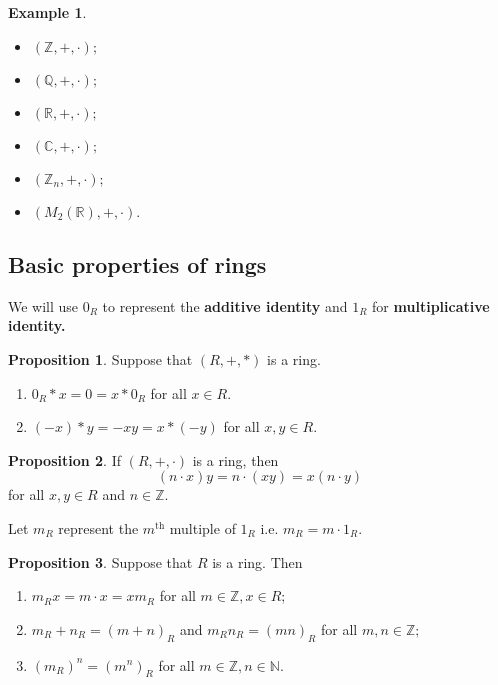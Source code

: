 \documentclass[12pt, a4paper]{article}
\newcommand{\bb}[1]{\mathbb{#1}}
\theoremstyle{definition}
\newtheorem*{example}{Example}
\newtheorem{proposition}{Proposition}
\theoremstyle{plain}
\begin{document}
\begin{example} \hphantom{This is to make it look nice.}
\begin{itemize}

	\item $(\bb{Z},+,\cdot);$

	\item $(\bb{Q},+,\cdot);$

	\item $(\bb{R},+,\cdot);$

	\item $(\bb{C},+,\cdot);$

	\item $(\bb{Z}_n,+,\cdot);$

	\item $(M_2(\bb{R}),+,\cdot).$

\end{itemize}
\end{example}

\subsection{Basic properties of rings}

We will use $0_R$ to represent the \textbf{additive identity} and $1_R$ for \textbf{multiplicative identity.}

\begin{proposition}
Suppose that $(R, +, *)$ is a ring.
\begin{enumerate}

	\item $0_R * x = 0 = x *0_R$ for all $x\in R.$

	\item $(-x) * y = -xy = x*(-y)$ for all $x,y \in R.$

\end{enumerate}
\end{proposition}

\begin{proposition}
If $(R,+,\cdot)$ is a ring, then 
$$(n\cdot x)y= n\cdot (xy) = x(n \cdot y)$$ for all $x,y \in R$ and $n\in \bb{Z}.$
\end{proposition}

Let $m_R$ represent the $m^{\text{th}}$ multiple of $1_R$ i.e. $m_R=m\cdot 1_R.$

\begin{proposition}
Suppose that $R$ is a ring. Then
\begin{enumerate}
	
	\item $m_Rx=m\cdot x=xm_R$ for all $m \in \bb{Z}, x
	\in R;$

	\item $m_R+n_R =(m+n)_R$ and $m_Rn_R=(mn)_R$ for all $m,n \in \bb{Z};$

	\item $(m_R)^n=(m^n)_R$ for all $m\in \bb{Z}, n\in \bb{N}.$
\end{enumerate}
\end{proposition}
\end{document}
